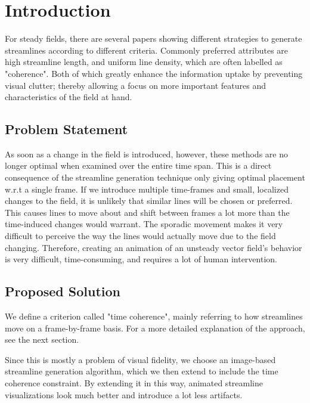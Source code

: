 
\chapter{Introduction}

For steady fields, there are several papers showing different strategies to generate streamlines according to different criteria.
Commonly preferred attributes are high streamline length, and uniform line density, which are often labelled as "coherence".
Both of which greatly enhance the information uptake by preventing visual clutter;
thereby allowing a focus on more important features and characteristics of the field at hand.

\section{Problem Statement}
As soon as a change in the field is introduced, however, these methods are no longer optimal when examined over the entire time span.
This is a direct consequence of the streamline generation technique only giving optimal placement w.r.t a single frame.
If we introduce multiple time-frames and small, localized changes to the field, it is unlikely that similar lines will be chosen or preferred.
This causes lines to move about and shift between frames a lot more than the time-induced changes would warrant.
The sporadic movement makes it very difficult to perceive the way the lines would actually move due to the field changing.
Therefore, creating an animation of an unsteady vector field's behavior is very difficult, time-consuming, and requires a lot of human intervention.

\section{Proposed Solution}
We define a criterion called "time coherence", mainly referring to how streamlines move on a frame-by-frame basis. 
For a more detailed explanation of the approach, see the next section.

Since this is mostly a problem of visual fidelity, we choose an image-based streamline generation algorithm,
which we then extend to include the time coherence constraint. 
By extending it in this way, animated streamline visualizations look much better and introduce a lot less artifacts.





